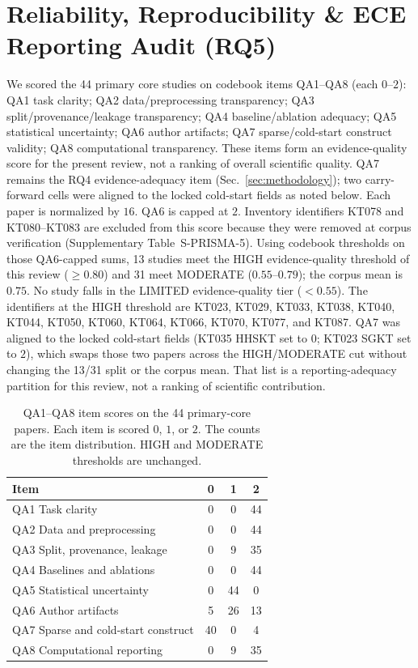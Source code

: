 \documentclass[lettersize,journal]{IEEEtran}
\begin{document}
\section{Reliability, Reproducibility \& ECE Reporting Audit (RQ5)}
\label{sec:reliability}
We scored the 44 primary core studies on codebook items QA1--QA8 (each $0$--$2$): QA1 task clarity; QA2 data/preprocessing transparency; QA3 split/provenance/leakage transparency; QA4 baseline/ablation adequacy; QA5 statistical uncertainty; QA6 author artifacts; QA7 sparse/cold-start construct validity; QA8 computational transparency. These items form an evidence-quality score for the present review, not a ranking of overall scientific quality. QA7 remains the RQ4 evidence-adequacy item (Sec.~\ref{sec:methodology}); two carry-forward cells were aligned to the locked cold-start fields as noted below. Each paper is normalized by $16$. QA6 is capped at $2$. Inventory identifiers KT078 and KT080--KT083 are excluded from this score because they were removed at corpus verification (Supplementary Table~S-PRISMA-5).
Using codebook thresholds on those QA6-capped sums, 13 studies meet the HIGH evidence-quality threshold of this review ($\ge 0.80$) and 31 meet MODERATE ($0.55$--$0.79$); the corpus mean is $0.75$. No study falls in the LIMITED evidence-quality tier ($< 0.55$). The identifiers at the HIGH threshold are KT023, KT029, KT033, KT038, KT040, KT044, KT050, KT060, KT064, KT066, KT070, KT077, and KT087. QA7 was aligned to the locked cold-start fields (KT035 HHSKT set to $0$; KT023 SGKT set to $2$), which swaps those two papers across the HIGH/MODERATE cut without changing the 13/31 split or the corpus mean. That list is a reporting-adequacy partition for this review, not a ranking of scientific contribution.
\begin{table}[t]
\caption{QA1--QA8 item scores on the 44 primary-core papers. Each item is scored $0$, $1$, or $2$. The counts are the item distribution. HIGH and MODERATE thresholds are unchanged.}
\label{tab:qa_distribution}
\centering
\footnotesize
\setlength{\tabcolsep}{6pt}
\begin{tabular}{@{}lccc@{}}
\toprule
\textbf{Item} & \textbf{0} & \textbf{1} & \textbf{2} \\
\midrule
QA1 Task clarity & 0 & 0 & 44 \\
QA2 Data and preprocessing & 0 & 0 & 44 \\
QA3 Split, provenance, leakage & 0 & 9 & 35 \\
QA4 Baselines and ablations & 0 & 0 & 44 \\
QA5 Statistical uncertainty & 0 & 44 & 0 \\
QA6 Author artifacts & 5 & 26 & 13 \\
QA7 Sparse and cold-start construct & 40 & 0 & 4 \\
QA8 Computational reporting & 0 & 9 & 35 \\
\bottomrule
\end{tabular}
\end{table}
\end{document}
